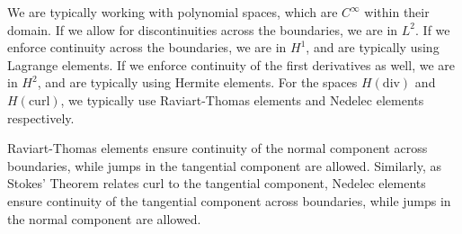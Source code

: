 We are typically working with polynomial spaces, which are $C^\infty$ within their domain.
If we allow for discontinuities across the boundaries, we are in $L^2$.
If we enforce continuity across the boundaries, we are in $H^1$, and are typically using Lagrange elements.
If we enforce continuity of the first derivatives as well, we are in $H^2$, and are typically using Hermite elements.
For the spaces $H(\mathrm{div})$ and $H(\mathrm{curl})$, we typically use Raviart-Thomas elements and Nedelec elements respectively.

Raviart-Thomas elements ensure continuity of the normal component across boundaries, while jumps in the tangential component are allowed.
Similarly, as Stokes' Theorem relates curl to the tangential component, Nedelec elements ensure continuity of the tangential component across boundaries, while jumps in the normal component are allowed.